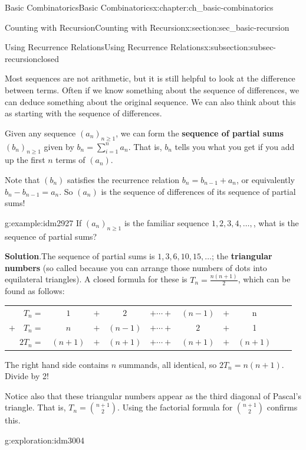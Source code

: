 \documentclass[oneside,10pt,]{book}
\newcommand{\terminology}[1]{\textbf{#1}}
\numberwithin{equation}{chapter}
\newcommand{\hrulethin}  {\noalign{\hrule height 0.04em}}
\begin{document}
\begin{chapterptx}{Basic Combinatorics}{}{Basic Combinatorics}{}{}{x:chapter:ch_basic-combinatorics}
\begin{sectionptx}{Counting with Recursion}{}{Counting with Recursion}{}{}{x:section:sec_basic-recursion}
\begin{subsectionptx}{Using Recurrence Relations}{}{Using Recurrence Relations}{}{}{x:subsection:subsec-recursionclosed}
\par
Most sequences are not arithmetic, but it is still helpful to look at the difference between terms.  Often if we know something about the sequence of differences, we can deduce something about the original sequence.   We can also think about this as starting with the sequence of differences.%
\par
Given any sequence \((a_n)_{n \ge 1}\), we can form the \terminology{sequence of partial sums} \((b_n)_{n \ge 1}\) given by \(b_n = \sum_{i = 1}^n a_n\).  That is, \(b_n\) tells you what you get if you add up the first \(n\) terms of \((a_n)\).%
\par
Note that \((b_n)\) satisfies the recurrence relation \(b_n = b_{n-1} + a_n\), or equivalently \(b_n - b_{n-1} = a_n\).  So \((a_n)\) is the sequence of differences of its sequence of partial sums!%
\begin{example}{}{g:example:idm2927}%
If \((a_n)_{n \ge 1}\) is the familiar sequence \(1, 2, 3, 4, \ldots,\), what is the sequence of partial sums?%
\par\smallskip%
\noindent\textbf{Solution}.\hypertarget{g:solution:idm2932}{}\quad{}The sequence of partial sums is \(1, 3, 6, 10, 15, \ldots\); the \terminology{triangular numbers} (so called because you can arrange those numbers of dots into equilateral triangles).  A closed formula for these is \(T_n = \frac{n(n+1)}{2}\), which can be found as follows:%
\begin{sidebyside}{1}{0}{0}{0}%
\begin{sbspanel}{1}%
{\centering%
\begin{tabular}{rccccccccc}
\(T_n  =\)&\(1\)&\(+\)&\(2\)&\(+ \cdots +\)&\((n-1)\)&\(+\)&n\tabularnewline[0pt]
\(+ \quad T_n  =\)&\(n\)&\(+\)&\((n-1)\)&\(+ \cdots +\)&\(2\)&\(+\)&1\tabularnewline\hrulethin
\(2T_n  =\)&\((n+1)\)&\(+\)&\((n+1)\)&\(+ \cdots +\)&\((n+1)\)&\(+\)&\((n+1)\)
\end{tabular}
\par}
\end{sbspanel}%
\end{sidebyside}%
\par
The right hand side contains \(n\) summands, all identical, so \(2T_n = n(n+1)\).  Divide by 2!%
\par
Notice also that these triangular numbers appear as the third diagonal of Pascal's triangle.  That is, \(T_n = \binom{n+1}{2}\).  Using the factorial formula for \(\binom{n+1}{2}\) confirms this.%
\end{example}
\begin{exploration}{}{g:exploration:idm3004}%

\end{exploration}
\end{subsectionptx}
\end{sectionptx}
\end{chapterptx}
\end{document}
